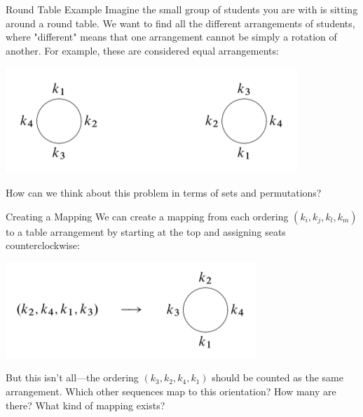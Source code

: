 \documentclass{beamer}
\begin{document}
\begin{frame}{Round Table Example}
    Imagine the small group of students you are with is sitting around a round table. We want to find all the different arrangements of students, where "different" means that one arrangement cannot be simply a rotation of another. For example, these are considered equal arrangements:
    \begin{center}
        \includegraphics[scale=.7]{roundequiv.png}
    \end{center}
    How can we think about this problem in terms of sets and permutations?
\end{frame}

\begin{frame}{Creating a Mapping}
    We can create a mapping from each ordering $(k_i, k_j, k_l, k_m)$ to a table arrangement by starting at the top and assigning seats counterclockwise:
    
    \begin{center}
    \includegraphics[scale=.7]{roundex1.png}
    \end{center}
    
    But this isn't all---the ordering $(k_3, k_2, k_4, k_1)$ should be counted as the same arrangement. Which other sequences map to this orientation? How many are there? What kind of mapping exists?
\end{frame}
\end{document}
